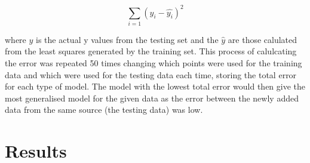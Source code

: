 \documentclass[]{article}
\begin{document}
\begin{equation}
  \sum\limits_{i=1} ({y_{i}} - \hat{y_{i}})^2
\end {equation}

where $y$ is the actual y values from the testing set and the $\hat{y}$ are
those calulated from the least squares generated by the training set. This
process of calulcating the error was repeated 50 times changing which points were
used for the training data and which were used for the testing data each time,
storing the total error for each type of model.
The model with the lowest total error would then give the most
generalised model for the given data as the error between
the newly added data from the same source (the testing data) was low.

\section{Results}
\end{document}
